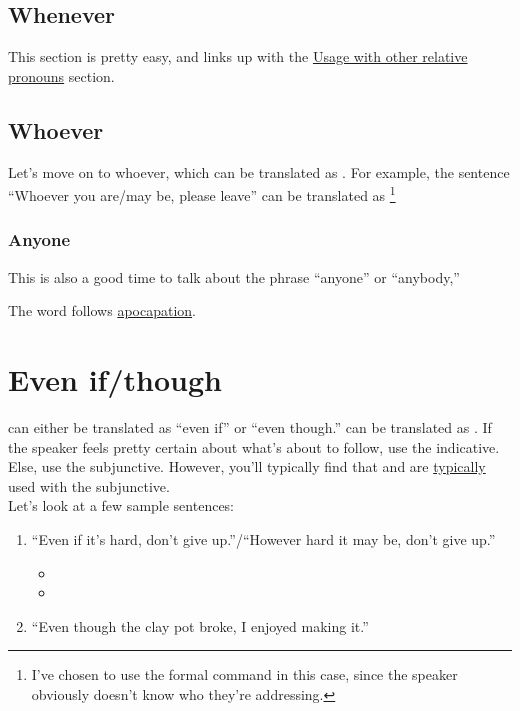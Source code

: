 \subsection{Whenever}

This section is pretty easy, and links up with the \hyperref[sec:relpro]{Usage with other relative pronouns} section. 

\subsection{Whoever}
Let's move on to whoever, which can be translated as . For example, the sentence  ``Whoever you are/may be, please leave'' can be translated as  \footnote{I've chosen to use the formal command in this case, since the speaker obviously doesn't know who they're addressing.}\\

\subsubsection{Anyone}
This is also a good time to talk about the phrase ``anyone'' or ``anybody,'' 


The word  follows \hyperref[sec:apo]{apocapation}. 

\section{Even if/though}

 can either be translated as ``even if'' or ``even though.''  can be translated as . If the speaker feels pretty certain about what's about to follow, use the indicative. Else, use the subjunctive. However, you'll typically find that  and  are \underline{typically} used with the subjunctive. \\

Let's look at a few sample sentences: 
\begin{enumerate}[noitemsep]
	\item ``Even if it's hard, don't give up.''/``However hard it may be, don't give up.'' \arr
		\begin{itemize}[noitemsep]
			\item {}
			\item {}
		\end{itemize}
	\item ``Even though the clay pot broke, I enjoyed making it.'' \arr {}
\end{enumerate}

